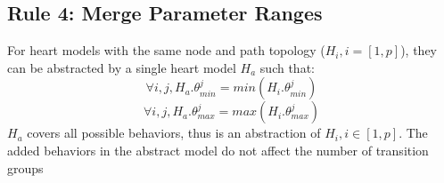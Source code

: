 %
\subsection{Rule 4: Merge Parameter Ranges}
For heart models with the same node and path topology ($H_i,i=[1,p]$), they can be abstracted by a single heart model $H_a$ such that:
$$\forall i,j,H_a.\theta^j_{min}=min(H_i.\theta^j_{min})$$ 
$$\forall i,j,H_a.\theta^j_{max}=max(H_i.\theta^j_{max})$$ 
$H_a$ covers all possible behaviors, thus is an abstraction of $H_i, i\in [1,p]$. The added behaviors in the abstract model do not affect the number of transition groups
%
%
%

